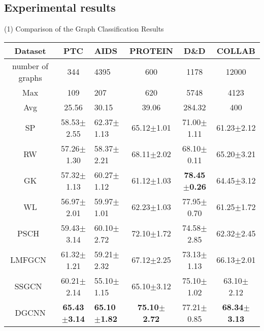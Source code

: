 \documentclass[11pt]{article}
\begin{document}
\subsection{Experimental results}
(1) Comparison of the Graph Classification Results


\begin {table*}[!htbp]
\small
 \caption{\label{tab:test}Comparison of Classification precision between four graph kernel and two graph CNN Methods on Multiple Graph Datasets} \centering
 \vspace{0.2in}
 \begin{tabular}{cclccc}
  \toprule
  Dataset & PTC & AIDS & PROTEIN & D\&D &  COLLAB \\
  \midrule
 number of graphs & 344 & 4395 & 600 & 1178  & 12000 \\
 Max & 109 & 207 & 620 & 5748  & 4123 \\
 Avg & 25.56 & 30.15 & 39.06 & 284.32  & 400 \\\hline
 SP & 58.53$\pm$2.55 & 62.37$\pm$1.13&65.12$\pm$1.01&71.00$\pm$1.11 &61.23$\pm$2.12 \\
 RW & 57.26$\pm$1.30 & 58.37$\pm$2.21&68.11$\pm$2.02&68.10$\pm$0.11 & 65.20$\pm$3.21 \\
 GK & 57.32$\pm$1.13& 60.27$\pm$1.12&61.12$\pm$1.03&\textbf{78.45$\pm$0.26}& 64.45$\pm$3.12 \\
 WL & 56.97$\pm$2.01 & 59.97$\pm$1.01&62.23$\pm$1.03&77.95$\pm$0.70 & 61.25$\pm$1.72 \\\hline
 PSCH~\cite{Niepert2016Learning_10} & 59.43$\pm$3.14 & 60.10$\pm$2.72&72.10$\pm$1.72&74.58$\pm$2.85 & 62.32$\pm$2.45\\
 LMFGCN~\cite{Duvenaud2015Convolutional} & 61.32$\pm$1.21 & 59.21$\pm$2.32 & 67.12$\pm$2.25 & 73.13$\pm$1.13 & 66.13$\pm$2.01\\
 SSGCN~\cite{Kipf2016Semi_14} & 60.21$\pm$2.14 & 55.10$\pm$1.15&65.10$\pm$3.12&75.10$\pm$1.02 & 63.10$\pm$ 2.12 \\\hline
 DGCNN & \textbf{65.43$\pm$3.14} & \textbf{65.10$\pm$1.82}& \textbf{75.10$\pm$2.72} &77.21$\pm$0.85 & \textbf{68.34$\pm$3.13} \\
  \bottomrule
 \end{tabular}
\end{table*}
\end{document}

